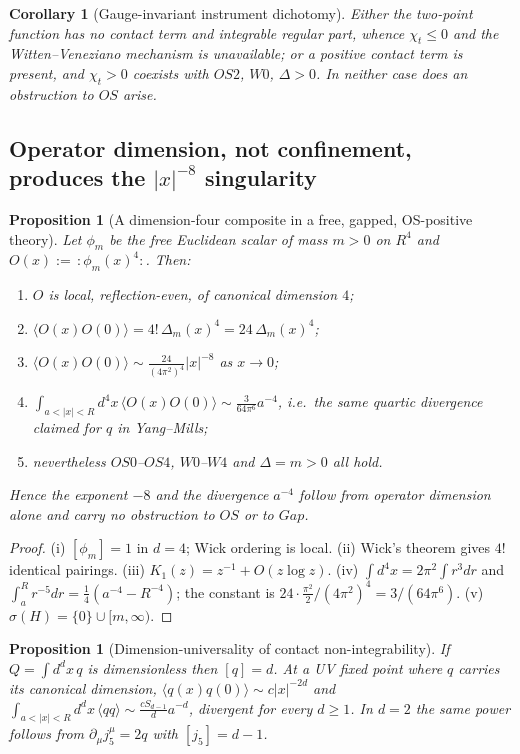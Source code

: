 \documentclass[11pt,a4paper]{article}
\def\R{R}\def\N{N}\def\Q{Q}\def\Z{Z}\def\Class{C}\def\OS{OS}\def\Gap{Gap}%
\theoremstyle{plain}
\newtheorem{proposition}[theorem]{Proposition}
\newtheorem{corollary}[theorem]{Corollary}
\theoremstyle{definition}
\theoremstyle{remark}
\newcommand{\R}{\mathbb{R}}\newcommand{\N}{\mathbb{N}}\newcommand{\Q}{\mathbb{Q}}
\newcommand{\Z}{\mathbb{Z}}\newcommand{\Spec}{\operatorname{Spec}}
\newcommand{\OS}{\mathrm{OS}}\newcommand{\Gap}{\mathrm{Gap}}
\newcommand{\Class}{\mathcal{C}}\newcommand{\Htot}{\mathcal{H}}
\newcommand{\Chit}{\chi_t}
\renewcommand{\_}{\oldunderscore\allowbreak}
\begin{document}
\begin{corollary}[Gauge-invariant instrument dichotomy]\label{cor:gaugeinv}
Either the two-point function has no contact term and integrable regular part, whence
$\Chit\le0$ and the Witten--Veneziano mechanism \cite{Witten1979,Veneziano1979} is unavailable;
or a positive contact term is present, and $\Chit>0$ coexists with $\OS2$, $W0$, $\Delta>0$.
In neither case does an obstruction to $\OS$ arise.
\end{corollary}
\subsection{Operator dimension, not confinement, produces the \texorpdfstring{$|x|^{-8}$}{|x|^-8} singularity}
\label{sub:dimfour}
\begin{proposition}[A dimension-four composite in a free, gapped, OS-positive theory]
\label{prop:dimfour}
Let $\phi_m$ be the free Euclidean scalar of mass $m>0$ on $\R^4$ and
$O(x):=\,:\!\phi_m(x)^4\!:$. Then:
\begin{enumerate}[label=(\roman*),leftmargin=22pt,itemsep=1pt]
\item $O$ is local, reflection-even, of canonical dimension $4$;
\item $\langle O(x)O(0)\rangle=4!\,\Delta_m(x)^4=24\,\Delta_m(x)^4$;
\item $\langle O(x)O(0)\rangle\sim\frac{24}{(4\pi^2)^4}|x|^{-8}$ as $x\to0$;
\item $\int_{a<|x|<R}d^4x\,\langle O(x)O(0)\rangle\sim\frac{3}{64\pi^6}a^{-4}$, i.e.\ the
\emph{same} quartic divergence claimed for $q$ in Yang--Mills;
\item nevertheless $\OS0$--$\OS4$, $W0$--$W4$ and $\Delta=m>0$ all hold.
\end{enumerate}
Hence the exponent $-8$ and the divergence $a^{-4}$ follow from \emph{operator dimension} alone
and carry \emph{no} obstruction to $\OS$ or to $\Gap$.
\end{proposition}
\begin{proof}
(i) $[\phi_m]=1$ in $d=4$; Wick ordering is local. (ii) Wick's theorem gives $4!$ identical
pairings. (iii) $K_1(z)=z^{-1}+O(z\log z)$. (iv) $\int d^4x=2\pi^2\int r^3dr$ and
$\int_a^Rr^{-5}dr=\tfrac14(a^{-4}-R^{-4})$; the constant is
$24\cdot\frac{\pi^2}{2}/(4\pi^2)^4=3/(64\pi^6)$. (v) $\sigma(H)=\{0\}\cup[m,\infty)$.
\end{proof}
\begin{proposition}[Dimension-universality of contact non-integrability]
\label{prop:contactuniversal}
If $Q=\int d^dx\,q$ is dimensionless then $[q]=d$. At a UV fixed point where $q$ carries its
canonical dimension, $\langle q(x)q(0)\rangle\sim c|x|^{-2d}$ and
$\int_{a<|x|<R}d^dx\,\langle qq\rangle\sim\frac{cS_{d-1}}{d}a^{-d}$, divergent for \emph{every}
$d\ge1$. In $d=2$ the same power follows from $\partial_\mu j_5^\mu=2q$ with $[j_5]=d-1$.
\end{proposition}
\end{document}
